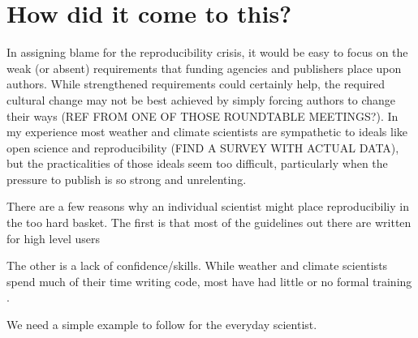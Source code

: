 \section{How did it come to this?}

In assigning blame for the reproducibility crisis, it would be easy to focus on the weak (or absent) requirements that funding agencies and publishers place upon authors. While strengthened requirements could certainly help, the required cultural change may not be best achieved by simply forcing authors to change their ways (REF FROM ONE OF THOSE ROUNDTABLE MEETINGS?). In my experience most weather and climate scientists are sympathetic to ideals like open science and reproducibility (FIND A SURVEY WITH ACTUAL DATA), but the practicalities of those ideals seem too difficult, particularly when the pressure to publish is so strong and unrelenting. 

There are a few reasons why an individual scientist might place reproducibiliy in the too hard basket. The first is that most of the guidelines out there are written for high level users 

The other is a lack of confidence/skills. While weather and climate scientists spend much of their time writing code, most have had little or no formal training \citet{Hannay2009}.   


We need a simple example to follow for the everyday scientist.